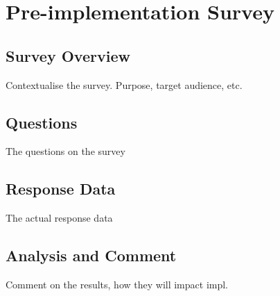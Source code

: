 
\chapter[Pre-implementation Survey]{Pre-implementation Survey} %

\label{Chapter5} %





\section{Survey Overview}
Contextualise the survey. Purpose, target audience, etc.


\section{Questions}
The questions on the survey


\section{Response Data}
The actual response data


\section{Analysis and Comment}
Comment on the results, how they will impact impl.


